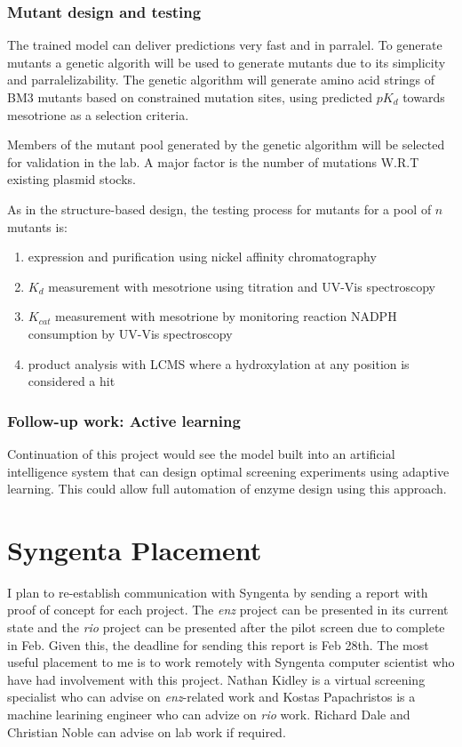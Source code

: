 \documentclass{article}
\begin{document}
\subsubsection{Mutant design and testing}
The trained model can deliver predictions very fast and in parralel. To generate mutants a genetic algorith will be used to generate mutants due to its simplicity and parralelizability. The genetic algorithm will generate amino acid strings of BM3 mutants based on constrained mutation sites, using predicted $pK_d$ towards mesotrione as a selection criteria. %
\par
Members of the mutant pool generated by the genetic algorithm will be selected for validation in the lab. A major factor is the number of mutations W.R.T existing plasmid stocks. %
\par
As in the structure-based design, the testing process for mutants for a pool of $n$ mutants is: %
\begin{enumerate}
\item expression and purification using nickel affinity chromatography
\item $K_d$ measurement with mesotrione using titration and UV-Vis spectroscopy
\item $K_{cat}$ measurement with mesotrione by monitoring reaction NADPH consumption by UV-Vis spectroscopy
\item product analysis with LCMS where a hydroxylation at any position is considered a hit
\end{enumerate}

\subsubsection{Follow-up work: Active learning}
\par
Continuation of this project would see the model built into an artificial intelligence system that can design optimal screening experiments using adaptive learning. This could allow full automation of enzyme design using this approach.

\section{Syngenta Placement}
I plan to re-establish communication with Syngenta by sending a report with proof of concept for each project. The \textit{enz} project can be presented in its current state and the \textit{rio} project can be presented after the pilot screen due to complete in Feb. %
Given this, the deadline for sending this report is Feb 28th. %
The most useful placement to me is to work remotely with Syngenta computer scientist who have had involvement with this project. Nathan Kidley is a virtual screening specialist who can advise on \textit{enz}-related work and Kostas Papachristos is a machine learining engineer who can advize on \textit{rio} work. Richard Dale and Christian Noble can advise on lab work if required. %
\end{document}
